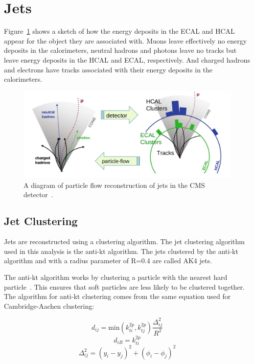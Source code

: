 \section{Jets}

Figure~\ref{fig:pflow_jets} shows a sketch of how the energy deposits in the ECAL and HCAL appear for the object they are associated with. Muons leave effectively no energy deposits in the calorimeters, neutral hadrons and photons leave no tracks but leave energy deposits in the HCAL and ECAL, respectively. And charged hadrons and electrons have tracks associated with their energy deposits in the calorimeters.


\begin{figure}[h]
\centering
\includegraphics[width=1.0\textwidth]{figures/particle_flow_pandolfi}
\caption{A diagram of particle flow reconstruction of jets in the CMS detector~\cite{pflow_pandolfi}.}
\label{fig:pflow_jets}
\end{figure}



\subsection*{Jet Clustering}


Jets are reconstructed using a clustering algorithm. The jet clustering algorithm used in this analysis is the anti-kt algorithm. The jets clustered by the anti-kt algorithm and with a radius parameter of R=0.4 are called AK4 jets.

The anti-kt algorithm works by clustering a particle with the nearest hard particle~\cite{anti-kt}. This ensures that soft particles are less likely to be clustered together. The algorithm for anti-kt clustering comes from the same equation used for Cambridge-Aachen clustering:

\begin{equation}
	d_{ij} = \text{min} \left( k^{2p}_{ti}, k^{2p}_{tj} \right) \frac{\Delta^2_{ij}}{R^2}
\end{equation}
\begin{equation}
	d_{iB} = k^{2p}_{ti}
\end{equation}
\begin{equation}
	\Delta_{ij}^2 = (y_i - y_j)^2 + (\phi_i - \phi_j)^2
\end{equation}

